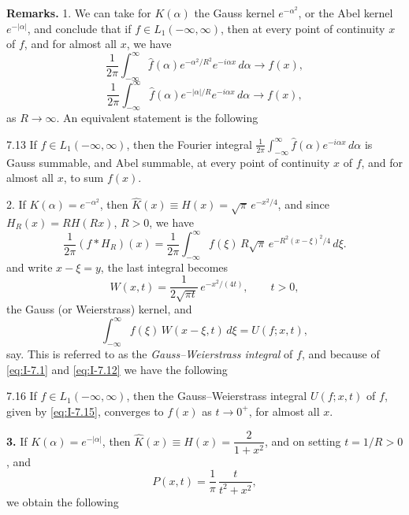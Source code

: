\noindent\textbf{Remarks.}
1. We can take for $K(\alpha)$ the Gauss kernel $e^{-\alpha^2}$, or the Abel kernel $e^{-|\alpha|}$, and conclude that if $f\in L_1(-\infty,\infty)$, then at every point of continuity $x$ of $f$, and for almost all $x$, we have
\begin{equation}\label{eq:I-7.12}
\frac{1}{2\pi}\int_{-\infty}^{\infty}\hat f(\alpha)e^{-\alpha^2/R^2}e^{-i\alpha x}\,d\alpha\to f(x),
\end{equation}
\begin{equation*}
\frac{1}{2\pi}\int_{-\infty}^{\infty}\hat f(\alpha)e^{-|\alpha|/R}e^{-i\alpha x}\,d\alpha\to f(x),
\end{equation*}
as $R\to\infty$. An equivalent statement is the following

\begin{nstmt}{7.13}\label{eq:I-7.13}
If $f\in L_1(-\infty,\infty)$, then the Fourier integral
$\frac{1}{2\pi}\int_{-\infty}^{\infty}\hat f(\alpha)e^{-i\alpha x}\,d\alpha$
is Gauss summable, and Abel summable, at every point of continuity $x$ of $f$, and for almost all $x$, to sum $f(x)$.
\end{nstmt}

2. If $K(\alpha)=e^{-\alpha^2}$, then $\hat K(x)\equiv H(x)=\sqrt\pi\,e^{-x^2/4}$, and since $H_R(x)=RH(Rx)$, $R>0$, we have
\begin{equation*}
\frac{1}{2\pi}(f*H_R)(x)
=\frac{1}{2\pi}\int_{-\infty}^{\infty}f(\xi)\,R\sqrt\pi\,e^{-R^2(x-\xi)^2/4}\,d\xi.
\end{equation*}
and write $x-\xi=y$, the last integral becomes
\begin{equation}\label{eq:I-7.14}\tag{7.14}
W(x,t)=\frac{1}{2\sqrt{\pi t}}\,e^{-x^{2}/(4t)},\qquad t>0,
\end{equation}
the Gauss (or Weierstrass) kernel, and
\begin{equation}\label{eq:I-7.15}\tag{7.15}
\int_{-\infty}^{\infty}f(\xi)\,W(x-\xi,t)\,d\xi=U(f;x,t),
\end{equation}
say. This is referred to as the \emph{Gauss--Weierstrass integral} of $f$, and because of \eqref{eq:I-7.1} and \eqref{eq:I-7.12} we have the following

\begin{nstmt}{7.16}\label{eq:I-7.16}
If $f\in L_1(-\infty,\infty)$, then the Gauss--Weierstrass integral $U(f;x,t)$ of $f$, given by \eqref{eq:I-7.15}, converges to $f(x)$ as $t\to 0^+$, for almost all $x$.
\end{nstmt}

\medskip\noindent\textbf{3.} If $K(\alpha)=e^{-|\alpha|}$, then $\hat K(x)\equiv H(x)=\dfrac{2}{1+x^{2}}$, and on setting $t=1/R>0$, and
\begin{equation}\label{eq:I-7.17}\tag{7.17}
P(x,t)=\frac{1}{\pi}\,\frac{t}{t^{2}+x^{2}},
\end{equation}
we obtain the following

